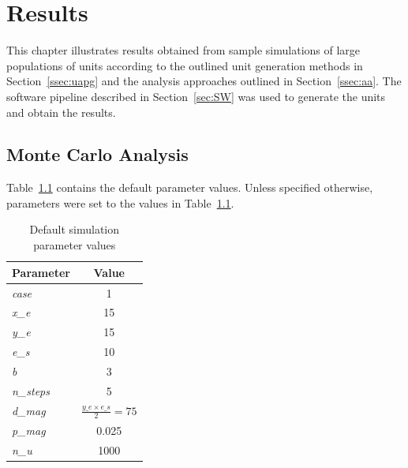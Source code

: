 \chapter{Results}
\label{chp:R}


This chapter illustrates results obtained from sample simulations of large populations of units according to the outlined unit generation methods in Section~\ref{ssec:uapg} and the analysis approaches outlined in Section~\ref{ssec:aa}. The software pipeline described in Section~\ref{sec:SW} was used to generate the units and obtain the results.

\section{Monte Carlo Analysis}

Table~\ref{tab:defpar} contains the default parameter values. Unless specified otherwise, parameters were set to the values in Table~\ref{tab:defpar}.

\begin{table}[H]
\centering
\caption{Default simulation parameter values}
\label{tab:defpar}
\begin{tabular}{@{}lc@{}}
\toprule
\multicolumn{1}{c}{\textbf{Parameter}} & \textbf{Value}                 \\ \midrule
\textit{case}                          & 1                              \\
\textit{x\_e}                          & 15                             \\
\textit{y\_e}                          & 15                             \\
\textit{e\_s}                          & 10                             \\
\textit{b}                             & 3                              \\
\textit{n\_steps}                      & 5                              \\
\textit{d\_mag}                        & $\frac{y\_e\times e\_s}{2}=75$ \\
\textit{p\_mag}                        & 0.025                          \\
\textit{n\_u}                          & 1000                           \\ \bottomrule
\end{tabular}
\end{table}

